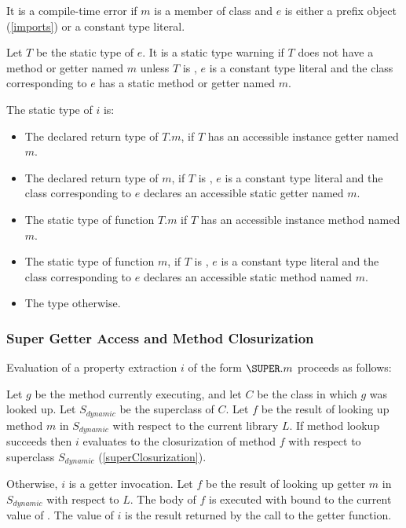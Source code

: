 \documentclass{article}
\begin{document}
\LMHash{}
It is a compile-time error if $m$ is a member of class  and $e$ is either a prefix object (\ref{imports}) or a constant type literal.


\LMHash{}
Let $T$ be the static type of $e$.
It is a static type warning if $T$ does not have a method or getter named $m$ unless $T$ is , $e$ is a constant type literal and the class corresponding to $e$ has a static method or getter named $m$.

\LMHash{}
The static type of $i$ is:
\begin{itemize}
\item The declared return type of $T.m$, if $T$ has an accessible instance getter named $m$.
\item The declared return type of $m$, if $T$ is , $e$ is a constant type literal and the class corresponding to $e$ declares an accessible static getter named $m$.
\item The static type of function $T.m$ if $T$ has an accessible instance method named $m$.
\item The static type of function $m$, if $T$ is , $e$ is a constant type literal and the class corresponding to $e$ declares an accessible static method named $m$.
\item The type \DYNAMIC{} otherwise.
\end{itemize}


\subsubsection{Super Getter Access and Method Closurization}

\LMHash{}
Evaluation of a property extraction $i$ of the form $\SUPER.m$ proceeds as follows:

\LMHash{}
Let $g$ be the method currently executing, and let $C$ be the class in which $g$ was looked up.
Let $S_{dynamic}$ be the superclass of $C$.
Let $f$ be the result of looking up method $m$ in $S_{dynamic}$ with respect to the current library $L$.
If method lookup succeeds then $i$ evaluates to the closurization of method $f$ with respect to superclass $S_{dynamic}$ (\ref{superClosurization}).

\LMHash{}
 Otherwise, $i$ is a getter invocation.
Let $f$ be the result of looking up getter $m$ in $S_{dynamic}$ with respect to $L$.
The body of $f$ is executed with \THIS{} bound to the current value of \THIS{}.
The value of $i$ is the result returned by the call to the getter function.
\end{document}
